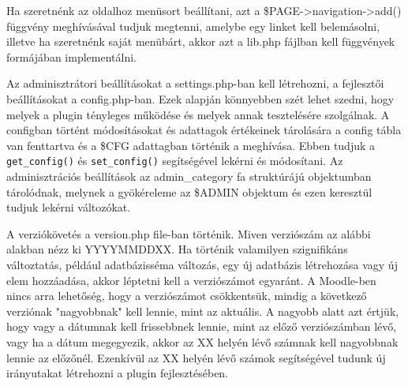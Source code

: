 Ha szeretnénk az oldalhoz menüsort beállítani, azt a \$PAGE->navigation->add() függvény meghívásával tudjuk megtenni, amelybe egy linket kell belemásolni, illetve ha szeretnénk saját menübárt, akkor azt a lib.php fájlban kell függvények formájában implementálni. \par

Az adminisztrátori beállításokat a settings.php-ban kell létrehozni, a fejlesztői beállításokat a config.php-ban. Ezek alapján könnyebben szét lehet szedni, hogy melyek a plugin tényleges működése és melyek annak tesztelésére szolgálnak. A configban történt módosításokat és adattagok értékeinek tárolására a config tábla van fenttartva és a \$CFG adattagban történik a meghívása. Ebben tudjuk a \texttt{get\_config()} és \texttt{set\_config()} segítségével lekérni és módosítani. Az adminisztrációs beállítások az admin\_category fa struktúrájú objektumban tárolódnak, melynek a gyökéreleme az \$ADMIN objektum és ezen keresztül tudjuk lekérni változókat. \par

A verziókövetés a version.php file-ban történik. Miven verziószám az alábbi alakban nézz ki YYYYMMDDXX. Ha történik valamilyen szignifikáns változtatás, például adatbázisséma változás, egy új adatbázis létrehozása vagy új elem hozzáadása, akkor léptetni kell a verziószámot egyaránt. A Moodle-ben nincs arra lehetőség, hogy a verziószámot csökkentsük, mindig a következő verziónak "nagyobbnak" kell lennie, mint az aktuális. A nagyobb alatt azt értjük, hogy vagy a dátumnak kell frissebbnek lennie, mint az előző verziószámban lévő, vagy ha a dátum megegyezik, akkor az XX helyén lévő számnak kell nagyobbnak lennie az előzőnél. Ezenkívül az XX helyén lévő számok segítségével tudunk új irányutakat létrehozni a plugin fejlesztésében. \par

